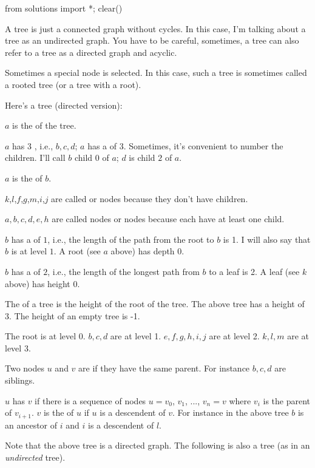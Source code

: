 \begin{python0}
from solutions import *; clear()
\end{python0}

A tree is just a connected graph without cycles.
In this case, I'm talking about a tree as an undirected
graph.
You have to be careful, sometimes, a tree can also 
refer to a tree as a directed graph and acyclic.

Sometimes a special node is selected.
In this case, such a tree is sometimes called a rooted tree
(or a tree with a root).

Here's a tree (directed version):



\begin{myenum}

  \li
  $a$ is the  of the tree.

  \li
  $a$ has 3 , i.e., $b,c,d$; 
  $a$ has a
  \sidebarskip{8pt}
  of 3.
  Sometimes, it's convenient to number the children.
  I'll call $b$ child $0$ of $a$; $d$ is child $2$ of $a$.

  \li
  $a$ is the  of $b$.

  \li
  $k$,$l$,$f$,$g$,$m$,$i$,$j$ are called
  \sidebarskip{-2pt}
  or
  \sidebarskip{12pt} nodes because
  they don't have children.

  \li
  $a,b,c,d,e,h$ are called
  \sidebarskip{-2pt}
   nodes or 
  \sidebarskip{12pt} nodes because 
  each have at least one child.

  \li
  $b$ has a  of $1$, i.e., 
  the length of the path from the root to $b$
  is 1. I will also say that $b$ is at level $1$.
  A root (see $a$ above) has depth 0.

  \li
  $b$ has a  of $2$, i.e., 
  the length of the longest path from 
  $b$ to a leaf is 2.
  A leaf (see $k$ above) has height 0.

  \li
  The  of a tree is the height of the root of the tree.
  The above tree has a height of 3.
  The height of an empty tree is -1.

  \li
  The root is at level 0. $b,c,d$ are at level 1.
  $e,f,g,h,i,j$ are at level 2. $k,l,m$ are at level 3.
  
  \li
  Two nodes $u$ and $v$ are  if they have
  the same parent.
  For instance $b,c,d$ are siblings.
  
  \li
  $u$ has  $v$ if there is a sequence of nodes 
  $u = v_0$, $v_1$, ..., $v_n = v$ where $v_i$ is the parent of $v_{i+1}$.
  $v$ is the  of $u$ if $u$ is a descendent of $v$.
  For instance in the above tree $b$ is an ancestor of $i$ and
  $i$ is a descendent of $l$.

\end{myenum}
Note that the above tree is a directed graph.
The following is also a tree (as in an \textit{undirected} tree).

